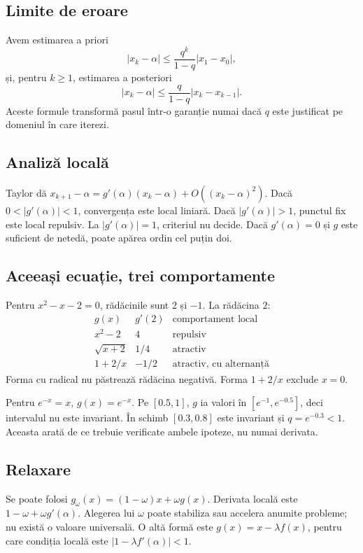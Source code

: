 \documentclass[11pt,a4paper]{article}
\begin{document}
\subsection{Limite de eroare}
Avem estimarea a priori
\[
|x_k-\alpha|\le\frac{q^k}{1-q}|x_1-x_0|,
\]
și, pentru $k\ge1$, estimarea a posteriori
\[
|x_k-\alpha|\le\frac{q}{1-q}|x_k-x_{k-1}|.
\]
Aceste formule transformă pasul într-o garanție numai dacă $q$ este justificat pe domeniul în care iterezi.

\subsection{Analiză locală}
Taylor dă $x_{k+1}-\alpha=g'(\alpha)(x_k-\alpha)+O((x_k-\alpha)^2)$. Dacă $0<|g'(\alpha)|<1$, convergența este local liniară. Dacă $|g'(\alpha)|>1$, punctul fix este local repulsiv. La $|g'(\alpha)|=1$, criteriul nu decide. Dacă $g'(\alpha)=0$ și $g$ este suficient de netedă, poate apărea ordin cel puțin doi.

\subsection{Aceeași ecuație, trei comportamente}
Pentru $x^2-x-2=0$, rădăcinile sunt $2$ și $-1$. La rădăcina $2$:
\[
\begin{array}{c|c|c}
g(x)&g'(2)&\text{comportament local}\\\hline
x^2-2&4&\text{repulsiv}\\
\sqrt{x+2}&1/4&\text{atractiv}\\
1+2/x&-1/2&\text{atractiv, cu alternanță}
\end{array}
\]
Forma cu radical nu păstrează rădăcina negativă. Forma $1+2/x$ exclude $x=0$.

Pentru $e^{-x}=x$, $g(x)=e^{-x}$. Pe $[0.5,1]$, $g$ ia valori în $[e^{-1},e^{-0.5}]$, deci intervalul nu este invariant. În schimb $[0.3,0.8]$ este invariant și $q=e^{-0.3}<1$. Aceasta arată de ce trebuie verificate ambele ipoteze, nu numai derivata.

\subsection{Relaxare}
Se poate folosi $g_\omega(x)=(1-\omega)x+\omega g(x)$. Derivata locală este $1-\omega+\omega g'(\alpha)$. Alegerea lui $\omega$ poate stabiliza sau accelera anumite probleme; nu există o valoare universală. O altă formă este $g(x)=x-\lambda f(x)$, pentru care condiția locală este $|1-\lambda f'(\alpha)|<1$.
\end{document}
